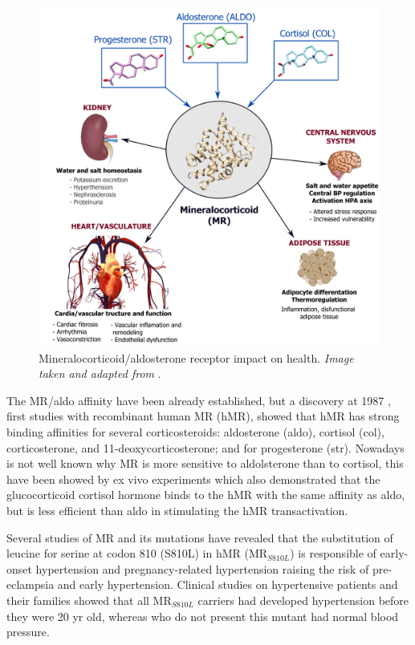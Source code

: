 \documentclass[letter,10pt, twocolumn]{article}
\begin{document}
\begin{figure}[h]
\centering
\includegraphics[scale=0.35]{MR-AS4-COL.png}
\caption{Mineralocorticoid/aldosterone receptor impact on health. \small{\textit{Image taken and adapted from}  \cite{book-MR_AS4}.}}
\label{MR_functions}
\end{figure}

The MR/aldo affinity have been already established, but a discovery at 1987 \cite{discovery}, first studies with recombinant human MR (hMR), showed that hMR has strong binding affinities for several corticosteroids: aldosterone (aldo), cortisol (col), corticosterone, and 11-deoxycorticosterone; and for progesterone (str). \cite{book-MR_AS4} Nowadays is not well known why MR is more sensitive to aldolsterone than to cortisol, this have been showed by ex vivo experiments which also demonstrated that the glucocorticoid cortisol hormone binds to the hMR with the same affinity as aldo, but is less efficient than aldo in stimulating the hMR transactivation. \cite{HELLALLEVY20001250}

Several studies of MR and its mutations have revealed that the substitution of leucine for serine at codon 810 (S810L) in hMR (MR$_{S810L}$) is responsible of early-onset hypertension and pregnancy-related hypertension raising the risk of pre-eclampsia and early hypertension. Clinical studies on hypertensive patients and their families showed that all MR$_{S810L}$ carriers had developed hypertension before they were 20 yr old, whereas who do not present this mutant had normal blood pressure. \cite{Severe, Activating_Mineralocorticoid}
\end{document}
